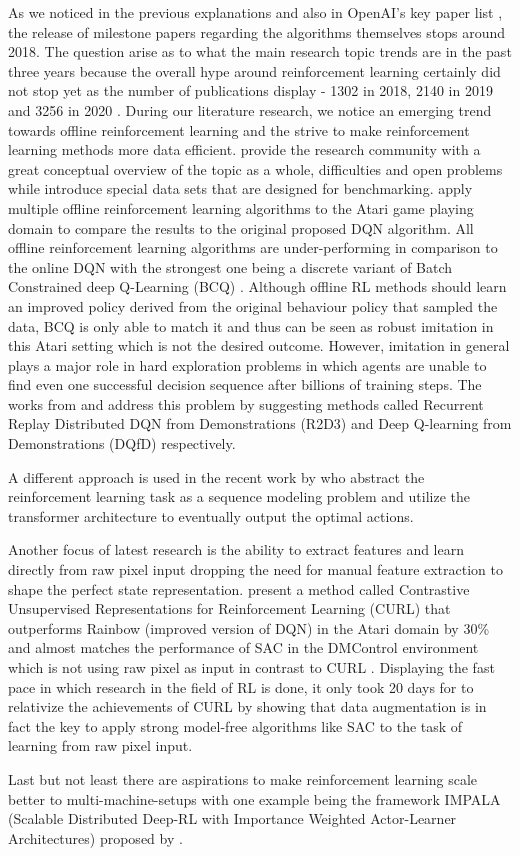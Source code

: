 \par
As we noticed in the previous explanations and also in OpenAI's key paper list \cite[]{keypaperlist}, the release of milestone papers regarding the algorithms themselves stops around 2018. The question arise as to what the main research topic trends are in the past three years because the overall hype around reinforcement learning certainly did not stop yet as the number of publications display - 1302 in 2018, 2140 in 2019 and 3256 in 2020 \cite[]{arxiv}. During our literature research, we notice an emerging trend towards offline reinforcement learning and the strive to make reinforcement learning methods more data efficient. \cite{levine2020offline} provide the research community with a great conceptual overview of the topic as a whole, difficulties and open problems while \cite{fu2021d4rl} introduce special data sets that are designed for benchmarking. \cite{fujimoto2019benchmarking} apply multiple offline reinforcement learning algorithms to the Atari game playing domain to compare the results to the original proposed DQN algorithm. All offline reinforcement learning algorithms are under-performing in comparison to the online DQN with the strongest one being a discrete variant of Batch Constrained deep Q-Learning (BCQ) \cite[pp.~7-9]{fujimoto2019benchmarking}. Although offline RL methods should learn an improved policy derived from the original behaviour policy that sampled the data, BCQ is only able to match it and thus can be seen as robust imitation in this Atari setting \cite[pp.~7]{fujimoto2019benchmarking} which is not the desired outcome.
However, imitation in general plays a major role in hard exploration problems in which agents are unable to find even one successful decision sequence after billions of training steps. The works from \cite{paine2019making} and \cite{hester2017deep} address this problem by suggesting methods called  Recurrent Replay Distributed DQN from Demonstrations (R2D3) and Deep Q-learning from Demonstrations (DQfD) respectively.
\par
A different approach is used in the recent work by \cite{chen2021decision} who abstract the reinforcement learning task as a sequence modeling problem and utilize the transformer architecture to eventually output the optimal actions.
\par
Another focus of latest research is the ability to extract features and learn directly from raw pixel input dropping the need for manual feature extraction to shape the perfect state representation. \cite{srinivas2020curl} present a method called Contrastive Unsupervised Representations for Reinforcement Learning (CURL) that outperforms Rainbow (improved version of DQN) in the Atari domain by 30\% and almost matches the performance of SAC in the DMControl environment which is not using raw pixel as input in contrast to CURL \cite[p.~7]{srinivas2020curl}. Displaying the fast pace in which research in the field of RL is done, it only took 20 days for \cite{kostrikov2021image} to relativize the achievements of CURL by showing that data augmentation is in fact the key to apply strong model-free algorithms like SAC to the task of learning from raw pixel input.
\par 
Last but not least there are aspirations to make reinforcement learning scale 
better to multi-machine-setups with one example being the framework IMPALA (Scalable Distributed Deep-RL with Importance Weighted
Actor-Learner Architectures) proposed by \cite{espeholt2018impala}.
